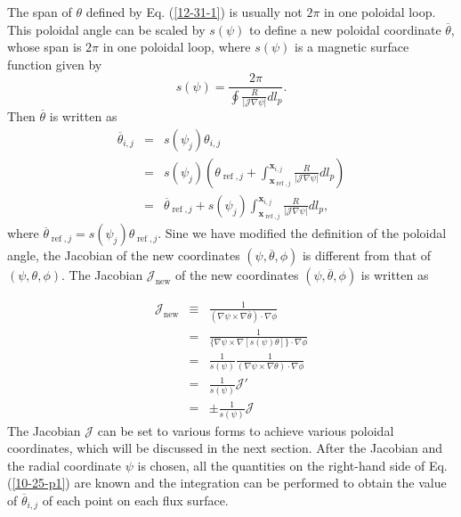 \documentclass{llncs}
\newcommand{\tmop}[1]{\ensuremath{\operatorname{#1}}}
\begin{document}
The span of $\theta$ defined by Eq. (\ref{12-31-1}) is usually not $2 \pi$ in
one poloidal loop. This poloidal angle can be scaled by $s (\psi)$ to define a
new poloidal coordinate $\overline{\theta}$, whose span is $2 \pi$ in one
poloidal loop, where $s (\psi)$ is a magnetic surface function given by
\begin{equation}
  s (\psi) = \frac{2 \pi}{\oint \frac{R}{|\mathcal{J} \nabla \psi |} d l_p} .
\end{equation}
Then $\overline{\theta}$ is written as
\begin{eqnarray}
  \overline{\theta}_{i, j} & = & s (\psi_j) \theta_{i, j} \nonumber\\
  & = & s (\psi_j) \left( \theta_{\tmop{ref}, j} +
  \int_{\mathbf{x}_{\tmop{ref}, j}}^{\mathbf{x}_{i, j}} \frac{R}{|\mathcal{J}
  \nabla \psi |} d l_p \right) \nonumber\\
  & = & \overline{\theta}_{\tmop{ref}, j} + s (\psi_j)
  \int_{\mathbf{x}_{\tmop{ref}, j}}^{\mathbf{x}_{i, j}} \frac{R}{|\mathcal{J}
  \nabla \psi |} d l_p,  \label{10-25-p1}
\end{eqnarray}
where $\overline{\theta}_{\tmop{ref}, j} = s (\psi_j) \theta_{\tmop{ref}, j}$.
Sine we have modified the definition of the poloidal angle, the Jacobian of
the new coordinates $(\psi, \overline{\theta}, \phi)$ is different from that
of $(\psi, \theta, \phi)$. The Jacobian $\mathcal{J}_{\tmop{new}}$ of the new
coordinates $(\psi, \overline{\theta}, \phi)$ is written as


\begin{eqnarray}
  \mathcal{J}_{\tmop{new}} & \equiv & \frac{1}{(\nabla \psi \times \nabla
  \overline{\theta}) \cdot \nabla \phi} \nonumber\\
  & = & \frac{1}{\{\nabla \psi \times \nabla [s (\psi) \theta]\} \cdot \nabla
  \phi} \nonumber\\
  & = & \frac{1}{s (\psi)}  \frac{1}{(\nabla \psi \times \nabla \theta) \cdot
  \nabla \phi} \nonumber\\
  & = & \frac{1}{s (\psi)} \mathcal{J}' \nonumber\\
  & = & \pm \frac{1}{s (\psi)} \mathcal{J}  \label{10-25-p7}
\end{eqnarray}
The Jacobian $\mathcal{J}$ can be set to various forms to achieve various
poloidal coordinates, which will be discussed in the next section. After the
Jacobian and the radial coordinate $\psi$ is chosen, all the quantities on the
right-hand side of Eq. (\ref{10-25-p1}) are known and the integration can be
performed to obtain the value of $\overline{\theta}_{i, j}$ of each point on
each flux surface.
\end{document}
